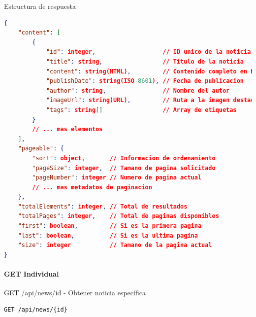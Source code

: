 \documentclass[11pt,a4paper]{article}
\begin{document}
\begin{center}
	\begin{minipage}{\textwidth}
		\begin{codebox}{Estructura de respuesta}
			\begin{lstlisting}[language=json]
{
    "content": [
        {
            "id": integer,                   // ID unico de la noticia
            "title": string,                 // Titulo de la noticia
            "content": string(HTML),         // Contenido completo en HTML
            "publishDate": string(ISO-8601), // Fecha de publicacion
            "author": string,                // Nombre del autor
            "imageUrl": string(URL),         // Ruta a la imagen destacada
            "tags": string[]                 // Array de etiquetas
        }
        // ... mas elementos
    ],
    "pageable": {
        "sort": object,       // Informacion de ordenamiento
        "pageSize": integer,  // Tamano de pagina solicitado
        "pageNumber": integer // Numero de pagina actual
        // ... mas metadatos de paginacion
    },
    "totalElements": integer, // Total de resultados
    "totalPages": integer,    // Total de paginas disponibles
    "first": boolean,         // Si es la primera pagina
    "last": boolean,          // Si es la ultima pagina
    "size": integer           // Tamano de la pagina actual
}
\end{lstlisting}
		\end{codebox}
	\end{minipage}
\end{center}

\paragraph{GET Individual}

\begin{center}
	\begin{minipage}{\textwidth}
		\begin{codebox}{GET /api/news/{id} - Obtener noticia específica}
			\begin{lstlisting}[language=HTTP]
GET /api/news/{id}
\end{lstlisting}
		\end{codebox}
	\end{minipage}
\end{center}
\end{document}
